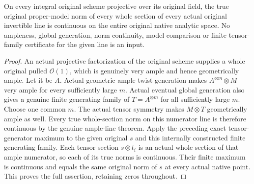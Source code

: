 \begin{theorem}
\label{thm:scheme-original-global-section-norm-continuous}
\leanok
{}
On every integral original scheme projective over its original field,
the true original proper-model norm of every whole section of every
actual original invertible line is continuous on the entire original
native analytic space. No ampleness, global generation, norm continuity,
model comparison or finite tensor-family certificate for the given line
is an input.
\end{theorem}
\begin{proof}
An actual projective factorization of the original scheme supplies a
whole original pulled $\mathcal O(1)$, which is genuinely very ample and
hence geometrically ample. Let it be $A$. Actual geometric ample-twist
generation makes $A^{\otimes m}\otimes M$ very ample for every sufficiently
large $m$. Actual eventual global generation also gives a genuine finite
generating family of $T=A^{\otimes m}$ for all sufficiently large $m$.
Choose one common $m$. The actual tensor symmetry makes $M\otimes T$
geometrically ample as well. Every true whole-section norm on this
numerator line is therefore continuous by the genuine ample-line theorem.
Apply the preceding exact tensor-generator maximum to the given original
$s$ and this internally constructed finite generating family. Each tensor
section $s\otimes t_i$ is an actual whole section of that ample numerator,
so each of its true norms is continuous. Their finite maximum is
continuous and equals the same original norm of $s$ at every actual
native point. This proves the full assertion, retaining zeros throughout.
\end{proof}
